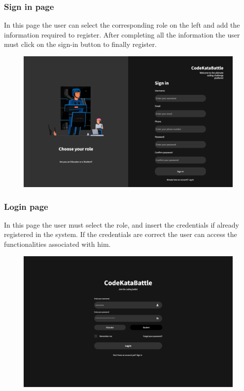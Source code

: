 \documentclass[12pt, a4paper]{report}
\begin{document}
        \subsubsection{Sign in page} 
        In this page the user can select the corresponding role on the left and add the information required to register.
        After completing all the information the user must click on the sign-in button to finally register.
        \begin{figure}[H]
            \centering
            \includegraphics[width=0.8\linewidth]{images/sign_in.png}
        \end{figure}

        \subsubsection{Login page} 
        In this page the user must select the role, and insert the credentials if already registered in the system. 
        If the credentials are correct the user can access the functionalities associated with him. 
        \begin{figure}[H]
            \centering
            \includegraphics[width=0.8\linewidth]{images/log_in.png}
        \end{figure}
\end{document}

